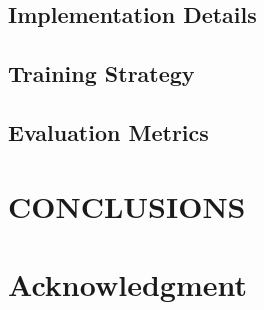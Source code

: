 \documentclass[conference]{IEEEtran}
\begin{document}
\subsection{Implementation Details}
\subsection{Training Strategy}
\subsection{Evaluation Metrics}

\section{CONCLUSIONS}
\section*{Acknowledgment}



\end{document}
